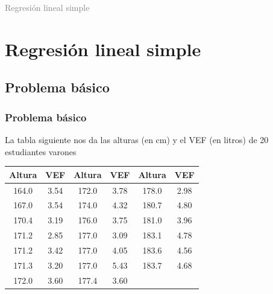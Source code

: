 \documentclass[12pt,t]{beamer}
\title[\red{Bioestadística}]{}
\author[]{Cesc Rosselló}
\date{}
\newcommand{\gray}[1]{\textcolor{gray}{#1}}
\theoremstyle{plain}
\theoremstyle{definition}
\begin{document}
\beamertemplatedotitem



\begin{frame}
\vfill
\begin{center}
\gray{\LARGE Regresión lineal simple}
\end{center}
\vfill
\end{frame}



\section{Regresión lineal simple}
\subsection{Problema básico}

\begin{frame}
\frametitle{Problema básico}

La tabla siguiente nos da las alturas (en cm) y el VEF (en litros) de 20 estudiantes varones\medskip

\begin{center}
\begin{tabular}{cc|cc|cc}
Altura & VEF & Altura & VEF &Altura & VEF \\\hline
164.0 & 3.54 & 172.0 & 3.78 & 178.0 & 2.98\\
167.0 & 3.54 & 174.0 & 4.32 & 180.7 & 4.80\\
170.4 & 3.19 & 176.0 & 3.75 & 181.0 & 3.96\\
171.2 & 2.85 & 177.0 & 3.09 & 183.1 & 4.78\\
171.2 & 3.42 & 177.0 & 4.05 & 183.6 & 4.56\\
171.3 & 3.20 & 177.0 & 5.43 & 183.7 & 4.68\\
172.0 & 3.60 & 177.4 & 3.60
\end{tabular}
\end{center}
\end{frame}
\end{document}
